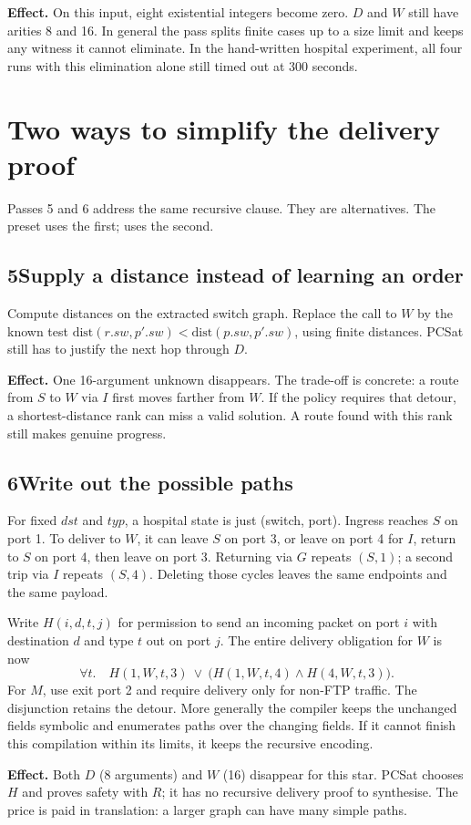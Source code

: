 \documentclass[11pt,a4paper]{article}
\newcommand{\pass}[2]{\subsection*{#1\quad #2}}
\newcommand{\code}[1]{\texttt{\detokenize{#1}}}
\begin{document}
\textbf{Effect.} On this input, eight existential integers become zero.
$D$ and $W$ still have arities 8 and 16. In general the pass splits finite
cases up to a size limit and keeps any witness it cannot eliminate. In the
hand-written hospital experiment, all four runs with this elimination alone
still timed out at 300 seconds.

\newpage
\section*{Two ways to simplify the delivery proof}
Passes 5 and 6 address the same recursive clause. They are alternatives.
The preset \code{bfs} uses the first; \code{all} uses the second.

\pass{5}{Supply a distance instead of learning an order}
Compute distances on the extracted switch graph. Replace the call to $W$ by
the known test $\mathrm{dist}(r.sw,p'.sw)<\mathrm{dist}(p.sw,p'.sw)$, using
finite distances. PCSat still has to justify the next hop through $D$.

\textbf{Effect.} One 16-argument unknown disappears. The trade-off is concrete:
a route from $S$ to $W$ via $I$ first moves farther from $W$. If the policy
requires that detour, a shortest-distance rank can miss a valid solution.
A route found with this rank still makes genuine progress.

\pass{6}{Write out the possible paths}
For fixed $dst$ and $typ$, a hospital state is just (switch, port).
Ingress reaches $S$ on port 1. To deliver to $W$, it can leave $S$ on port 3,
or leave on port 4 for $I$, return to $S$ on port 4, then leave on port 3.
Returning via $G$ repeats $(S,1)$; a second trip via $I$ repeats $(S,4)$.
Deleting those cycles leaves the same endpoints and the same payload.

Write $H(i,d,t,j)$ for permission to send an incoming packet on port $i$
with destination $d$ and type $t$ out on port $j$. The entire delivery
obligation for $W$ is now
\[
  \forall t.\quad H(1,W,t,3)\ \lor\ \bigl(H(1,W,t,4)\land H(4,W,t,3)\bigr).
\]
For $M$, use exit port 2 and require delivery only for non-FTP traffic.
The disjunction retains the detour. More generally the compiler keeps the
unchanged fields symbolic and enumerates paths over the changing fields.
If it cannot finish this compilation within its limits, it keeps the
recursive encoding.

\textbf{Effect.} Both $D$ (8 arguments) and $W$ (16) disappear for this star.
PCSat chooses $H$ and proves safety with $R$; it has no recursive delivery
proof to synthesise. The price is paid in translation: a larger graph can
have many simple paths.
\end{document}
